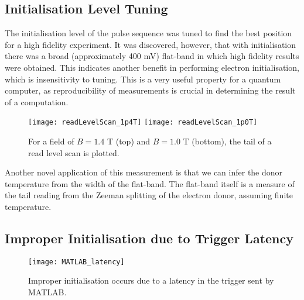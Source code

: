 \subsection{Initialisation Level Tuning}
	The initialisation level of the pulse sequence was tuned to find the best position for a high fidelity experiment. It was discovered, however, that with initialisation there was a broad (approximately 400 mV) flat-band in which high fidelity results were obtained. This indicates another benefit in performing electron initialisation, which is insensitivity to tuning. This is a very useful property for a quantum computer, as reproducibility of measurements is crucial in determining the result of a computation.
%	
	\begin{figure}[htbp!]
		\flushleft
		\texttt{[image: readLevelScan\_1p4T]}
		\texttt{[image: readLevelScan\_1p0T]}
		\caption{For a field of $B = 1.4$ T (top) and $B = 1.0$ T (bottom), the tail of a read level scan is plotted.}
	\end{figure}
	
	Another novel application of this measurement is that we can infer the donor temperature from the width of the flat-band. The flat-band itself is a measure of the tail reading from the Zeeman splitting of the electron donor, assuming finite temperature.

\subsection{Improper Initialisation due to Trigger Latency}
	
	\begin{figure}[htbp!]
		\centering
		\texttt{[image: MATLAB\_latency]}
		\caption{Improper initialisation occurs due to a latency in the trigger sent by MATLAB.}
		\label{fig::latency}
	\end{figure}